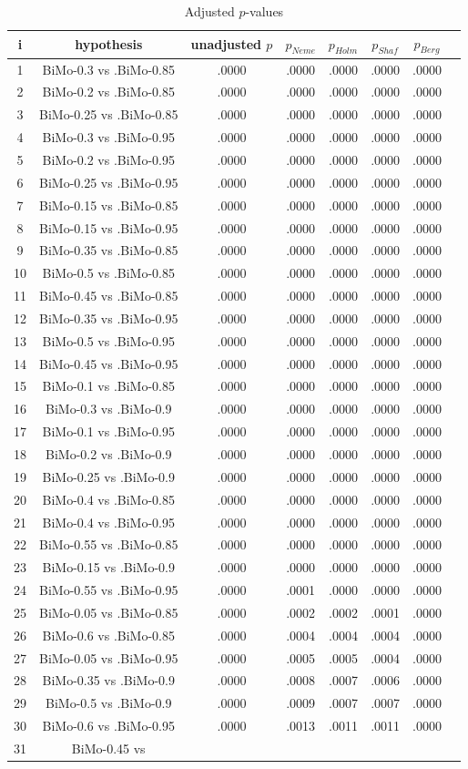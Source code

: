 \documentclass[a4paper,10pt]{article}
\begin{document}
\begin{landscape}
\begin{table}[!htp]
\centering\tiny
\caption{Adjusted $p$-values}
\begin{tabular}{cccccccc}
i&hypothesis&unadjusted $p$&$p_{Neme}$&$p_{Holm}$&$p_{Shaf}$&$p_{Berg}$\\
\hline
1&BiMo-0.3 vs .BiMo-0.85&.0000&.0000&.0000&.0000&.0000\\2&BiMo-0.2 vs .BiMo-0.85&.0000&.0000&.0000&.0000&.0000\\3&BiMo-0.25 vs .BiMo-0.85&.0000&.0000&.0000&.0000&.0000\\4&BiMo-0.3 vs .BiMo-0.95&.0000&.0000&.0000&.0000&.0000\\5&BiMo-0.2 vs .BiMo-0.95&.0000&.0000&.0000&.0000&.0000\\6&BiMo-0.25 vs .BiMo-0.95&.0000&.0000&.0000&.0000&.0000\\7&BiMo-0.15 vs .BiMo-0.85&.0000&.0000&.0000&.0000&.0000\\8&BiMo-0.15 vs .BiMo-0.95&.0000&.0000&.0000&.0000&.0000\\9&BiMo-0.35 vs .BiMo-0.85&.0000&.0000&.0000&.0000&.0000\\10&BiMo-0.5 vs .BiMo-0.85&.0000&.0000&.0000&.0000&.0000\\11&BiMo-0.45 vs .BiMo-0.85&.0000&.0000&.0000&.0000&.0000\\12&BiMo-0.35 vs .BiMo-0.95&.0000&.0000&.0000&.0000&.0000\\13&BiMo-0.5 vs .BiMo-0.95&.0000&.0000&.0000&.0000&.0000\\14&BiMo-0.45 vs .BiMo-0.95&.0000&.0000&.0000&.0000&.0000\\15&BiMo-0.1 vs .BiMo-0.85&.0000&.0000&.0000&.0000&.0000\\16&BiMo-0.3 vs .BiMo-0.9&.0000&.0000&.0000&.0000&.0000\\17&BiMo-0.1 vs .BiMo-0.95&.0000&.0000&.0000&.0000&.0000\\18&BiMo-0.2 vs .BiMo-0.9&.0000&.0000&.0000&.0000&.0000\\19&BiMo-0.25 vs .BiMo-0.9&.0000&.0000&.0000&.0000&.0000\\20&BiMo-0.4 vs .BiMo-0.85&.0000&.0000&.0000&.0000&.0000\\21&BiMo-0.4 vs .BiMo-0.95&.0000&.0000&.0000&.0000&.0000\\22&BiMo-0.55 vs .BiMo-0.85&.0000&.0000&.0000&.0000&.0000\\23&BiMo-0.15 vs .BiMo-0.9&.0000&.0000&.0000&.0000&.0000\\24&BiMo-0.55 vs .BiMo-0.95&.0000&.0001&.0000&.0000&.0000\\25&BiMo-0.05 vs .BiMo-0.85&.0000&.0002&.0002&.0001&.0000\\26&BiMo-0.6 vs .BiMo-0.85&.0000&.0004&.0004&.0004&.0000\\27&BiMo-0.05 vs .BiMo-0.95&.0000&.0005&.0005&.0004&.0000\\28&BiMo-0.35 vs .BiMo-0.9&.0000&.0008&.0007&.0006&.0000\\29&BiMo-0.5 vs .BiMo-0.9&.0000&.0009&.0007&.0007&.0000\\30&BiMo-0.6 vs .BiMo-0.95&.0000&.0013&.0011&.0011&.0000\\31&BiMo-0.45 vs 
\end{tabular}
\end{table}
\end{landscape}
\end{document}
